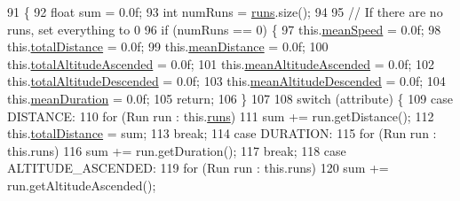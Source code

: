 \begin{DoxyCode}
91                                                        \{
92         \textcolor{keywordtype}{float} sum = 0.0f;
93         \textcolor{keywordtype}{int} numRuns = \mbox{\hyperlink{classcom_1_1activitytracker_1_1_run_stats_a0fd429e9f463ddf4897c507c0e3c0a12}{runs}}.size();
94 
95         \textcolor{comment}{// If there are no runs, set everything to 0}
96         \textcolor{keywordflow}{if} (numRuns == 0) \{
97             this.\mbox{\hyperlink{classcom_1_1activitytracker_1_1_run_stats_a64b9e6daf2be19571b8ad401922762c2}{meanSpeed}} = 0.0f;
98             this.\mbox{\hyperlink{classcom_1_1activitytracker_1_1_run_stats_a2e9486ea214a828e9f58489fd2b1a718}{totalDistance}} = 0.0f;
99             this.\mbox{\hyperlink{classcom_1_1activitytracker_1_1_run_stats_afcc9ab47852b6df6b15e9a592fe6c5ed}{meanDistance}} = 0.0f;
100             this.\mbox{\hyperlink{classcom_1_1activitytracker_1_1_run_stats_a1108dd2b031415da72508a5172335dd4}{totalAltitudeAscended}} = 0.0f;
101             this.\mbox{\hyperlink{classcom_1_1activitytracker_1_1_run_stats_aecbe62c15075fe9be1604333c355fab6}{meanAltitudeAscended}} = 0.0f;
102             this.\mbox{\hyperlink{classcom_1_1activitytracker_1_1_run_stats_ae511b3772f61773885d0178b215786d7}{totalAltitudeDescended}} = 0.0f;
103             this.\mbox{\hyperlink{classcom_1_1activitytracker_1_1_run_stats_a578eae64367a00c625f4685fe879fe7c}{meanAltitudeDescended}} = 0.0f;
104             this.\mbox{\hyperlink{classcom_1_1activitytracker_1_1_run_stats_a8bf9f1577cffd26e6235695278bfcdb9}{meanDuration}} = 0.0f;
105             \textcolor{keywordflow}{return};
106         \}
107 
108         \textcolor{keywordflow}{switch} (attribute) \{
109             \textcolor{keywordflow}{case} DISTANCE:
110                 \textcolor{keywordflow}{for} (Run run : this.\mbox{\hyperlink{classcom_1_1activitytracker_1_1_run_stats_a0fd429e9f463ddf4897c507c0e3c0a12}{runs}})
111                     sum += run.getDistance();
112                 this.\mbox{\hyperlink{classcom_1_1activitytracker_1_1_run_stats_a2e9486ea214a828e9f58489fd2b1a718}{totalDistance}} = sum;
113                 \textcolor{keywordflow}{break};
114             \textcolor{keywordflow}{case} DURATION:
115                 \textcolor{keywordflow}{for} (Run run : this.runs)
116                     sum += run.getDuration();
117                 \textcolor{keywordflow}{break};
118             \textcolor{keywordflow}{case} ALTITUDE\_ASCENDED:
119                 \textcolor{keywordflow}{for} (Run run : this.runs)
120                     sum += run.getAltitudeAscended();

\end{DoxyCode}
